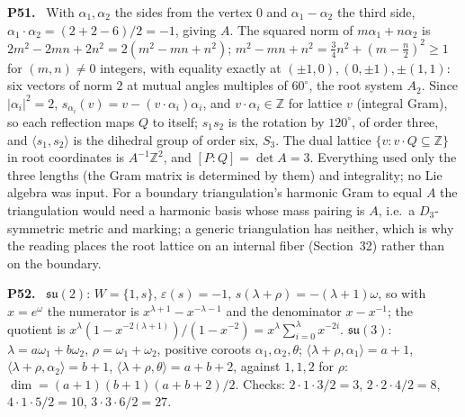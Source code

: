 \documentclass[11pt]{article}
\newcommand{\Z}{\mathbb{Z}}
\newenvironment{solution}[1]{\medskip\noindent\textbf{P#1.}\ }{\par\medskip}
\begin{document}
\begin{solution}{51}
With $\alpha_1,\alpha_2$ the sides from the vertex $0$ and $\alpha_1-\alpha_2$
the third side, $\alpha_1\cdot\alpha_2 = (2+2-6)/2 = -1$, giving $A$. The
squared norm of $m\alpha_1+n\alpha_2$ is $2m^2-2mn+2n^2 = 2(m^2-mn+n^2)$;
$m^2-mn+n^2 = \tfrac34n^2+(m-\tfrac n2)^2\ge1$ for $(m,n)\ne0$ integers, with
equality exactly at $(\pm1,0),(0,\pm1),\pm(1,1)$: six vectors of norm $2$ at
mutual angles multiples of $60^\circ$, the root system $A_2$. Since
$|\alpha_i|^2 = 2$, $s_{\alpha_i}(v) = v-(v\cdot\alpha_i)\alpha_i$, and
$v\cdot\alpha_i\in\Z$ for lattice $v$ (integral Gram), so each reflection maps
$Q$ to itself; $s_1s_2$ is the rotation by $120^\circ$, of order three, and
$\langle s_1,s_2\rangle$ is the dihedral group of order six, $S_3$. The dual
lattice $\{v: v\cdot Q\subseteq\Z\}$ in root coordinates is $A^{-1}\Z^2$, and
$[P:Q] = \det A = 3$. Everything used only the three lengths (the Gram matrix
is determined by them) and integrality; no Lie algebra was input. For a
boundary triangulation's harmonic Gram to equal $A$ the triangulation would
need a harmonic basis whose mass pairing is $A$, i.e.\ a $D_3$-symmetric
metric and marking; a generic triangulation has neither, which is why the
reading places the root lattice on an internal fiber (Section~32) rather
than on the boundary.
\end{solution}

\begin{solution}{52}
$\mathfrak{su}(2)$: $W = \{1,s\}$, $\varepsilon(s) = -1$,
$s(\lambda+\rho) = -(\lambda+1)\omega$, so with $x = e^{\omega}$ the
numerator is $x^{\lambda+1}-x^{-\lambda-1}$ and the denominator
$x-x^{-1}$; the quotient is
$x^{\lambda}(1-x^{-2(\lambda+1)})/(1-x^{-2}) = x^{\lambda}\sum_{i=0}^{\lambda}x^{-2i}$.
$\mathfrak{su}(3)$: $\lambda = a\omega_1+b\omega_2$, $\rho = \omega_1+\omega_2$,
positive coroots $\alpha_1,\alpha_2,\theta$;
$\langle\lambda+\rho,\alpha_1\rangle = a+1$,
$\langle\lambda+\rho,\alpha_2\rangle = b+1$,
$\langle\lambda+\rho,\theta\rangle = a+b+2$, against $1,1,2$ for $\rho$:
$\dim = (a+1)(b+1)(a+b+2)/2$. Checks: $2\cdot1\cdot3/2 = 3$,
$2\cdot2\cdot4/2 = 8$, $4\cdot1\cdot5/2 = 10$, $3\cdot3\cdot6/2 = 27$.
\end{solution}
\end{document}
